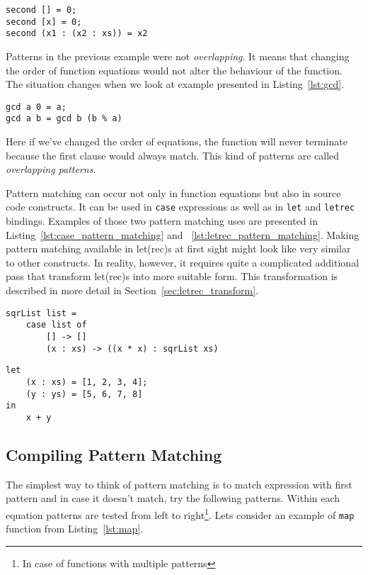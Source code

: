 \documentclass[a4paper]{report}
\begin{document}
\begin{lstlisting}[label=lst:second_element,caption={Greatest common divisor.}]
second [] = 0;
second [x] = 0;
second (x1 : (x2 : xs)) = x2
\end{lstlisting}

Patterns in the previous example were not \textit{overlapping}. It
means that changing the order of function equations would not alter the
behaviour of the function. The situation changes when we look at example
presented in Listing~\ref{lst:gcd}.

\begin{lstlisting}[label=lst:gcd,caption={Greatest common divisor.}]
gcd a 0 = a;
gcd a b = gcd b (b % a)
\end{lstlisting}

Here if we've changed the order of equations, the function will never terminate
because the first clause would always match. This kind of patterns are called
\textit{overlapping patterns}.

Pattern matching can occur not only in function equations but also in source
code constructs. It can be used in \texttt{case} expressions as well as in
\texttt{let} and \texttt{letrec} bindings. Examples of those two pattern
matching uses are presented in Listing~\ref{lst:case_pattern_matching} and
~\ref{lst:letrec_pattern_matching}.  Making pattern matching available in
let(rec)s at first sight might look like very similar to other constructs. In
reality, however, it requires quite a complicated additional pass that
transform let(rec)s into more suitable form.  This transformation is described
in more detail in Section~\ref{sec:letrec_transform}.

\begin{lstlisting}[label=lst:case_pattern_matching,caption={Pattern matching in
case expressions.}]
sqrList list =
    case list of
        [] -> []
        (x : xs) -> ((x * x) : sqrList xs)
\end{lstlisting}

\begin{lstlisting}[label=lst:letrec_pattern_matching,caption={Pattern matching
  in let(rec) expressions.}]
let
    (x : xs) = [1, 2, 3, 4];
    (y : ys) = [5, 6, 7, 8]
in
    x + y
\end{lstlisting}

\subsection{Compiling Pattern Matching}
The simplest way to think of pattern matching is to match expression with first
pattern and in case it doesn't match, try the following patterns. Within each
equation patterns are tested from left to right\footnote{In case of functions
with multiple patterns}. Lets consider an example of \texttt{map} function from
Listing~\ref{lst:map}.
\end{document}
